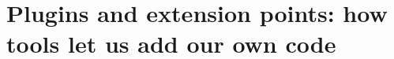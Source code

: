 \chapter{Plugins and extension points: how tools let us add our own code}
\label{ch:plugins-and-extension-points-how-tools}

